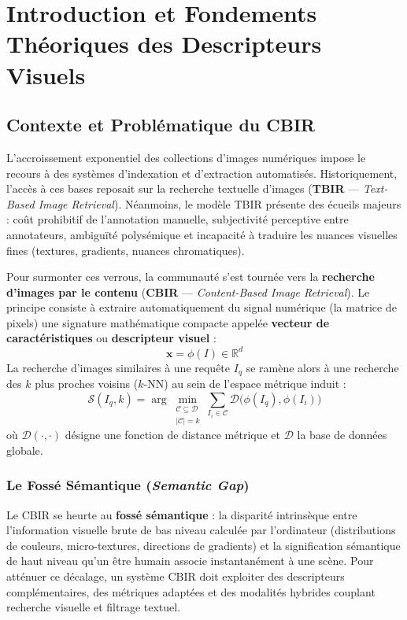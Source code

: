 \chapter{Introduction et Fondements Théoriques des Descripteurs Visuels}
\label{chap:intro_descripteurs}

\section{Contexte et Problématique du CBIR}

L'accroissement exponentiel des collections d'images numériques impose le recours à des systèmes d'indexation et d'extraction automatisés. Historiquement, l'accès à ces bases reposait sur la recherche textuelle d'images (\textbf{TBIR} — \textit{Text-Based Image Retrieval}). Néanmoins, le modèle TBIR présente des écueils majeurs : coût prohibitif de l'annotation manuelle, subjectivité perceptive entre annotateurs, ambiguïté polysémique et incapacité à traduire les nuances visuelles fines (textures, gradients, nuances chromatiques).

Pour surmonter ces verrous, la communauté s'est tournée vers la \textbf{recherche d'images par le contenu} (\textbf{CBIR} — \textit{Content-Based Image Retrieval}). Le principe consiste à extraire automatiquement du signal numérique (la matrice de pixels) une signature mathématique compacte appelée \textbf{vecteur de caractéristiques} ou \textbf{descripteur visuel} :
\begin{equation}
    \mathbf{x} = \phi(I) \in \mathbb{R}^d
\end{equation}
La recherche d'images similaires à une requête $I_q$ se ramène alors à une recherche des $k$ plus proches voisins ($k$-NN) au sein de l'espace métrique induit :
\begin{equation}
    \mathcal{S}(I_q, k) = \arg\min_{\substack{\mathcal{C} \subseteq \mathcal{D} \\ |\mathcal{C}| = k}} \sum_{I_i \in \mathcal{C}} \mathcal{D}\big(\phi(I_q), \phi(I_i)\big)
\end{equation}
où $\mathcal{D}(\cdot, \cdot)$ désigne une fonction de distance métrique et $\mathcal{D}$ la base de données globale.

\subsection{Le Fossé Sémantique (\textit{Semantic Gap})}
Le CBIR se heurte au \textbf{fossé sémantique} \cite{smeulders2000} : la disparité intrinsèque entre l'information visuelle brute de bas niveau calculée par l'ordinateur (distributions de couleurs, micro-textures, directions de gradients) et la signification sémantique de haut niveau qu'un être humain associe instantanément à une scène. Pour atténuer ce décalage, un système CBIR doit exploiter des descripteurs complémentaires, des métriques adaptées et des modalités hybrides couplant recherche visuelle et filtrage textuel.


